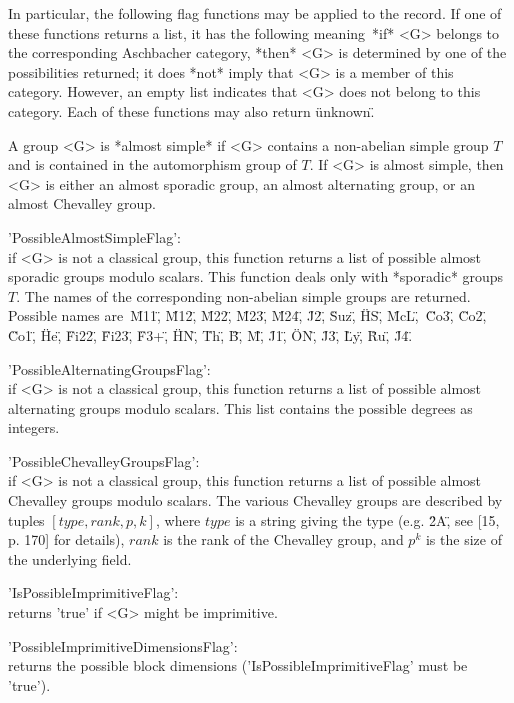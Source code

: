In particular, the following flag functions may be applied to the record.
If one of these functions returns a list, it has the following meaning\:\
*if* <G> belongs to the corresponding  Aschbacher category, *then* <G> is
determined by one of the possibilities returned; it does *not* imply that
<G> is a member  of this category. However, an  empty list indicates that
<G> does not belong  to this category.   Each of these functions may also
return \"unknown\".

A group <G> is *almost simple* if <G> contains a non-abelian simple group
$T$ and is contained in the automorphism group of $T$.   If <G> is almost
simple,   then <G>   is  either  an almost  sporadic     group, an almost
alternating group, or an almost Chevalley group.
    
'PossibleAlmostSimpleFlag':\\
    if  <G>  is not a  classical group, this function returns   a list of
    possible   almost sporadic groups modulo   scalars.   This
    function deals only  with *sporadic*  groups  $T$.  The names  of the
    corresponding non-abelian  simple groups are returned. Possible names
    are\:\ \"M11\", \"M12\", \"M22\",   \"M23\", \"M24\", \"J2\", \"Suz\",
    \"HS\",   \"McL\",\  \"Co3\",  \"Co2\",   \"Co1\",  \"He\", \"Fi22\",
    \"Fi23\", \"F3+\",  \"HN\",  \"Th\",  \"B\", \"M\",  \"J1\",  \"ON\",
    \"J3\", \"Ly\", \"Ru\", \"J4\".  

'PossibleAlternatingGroupsFlag':\\
    if   <G> is not  a classical  group, this function  returns a list of
    possible   almost  alternating  groups  modulo   scalars.   This list
    contains the possible degrees as integers.

'PossibleChevalleyGroupsFlag':\\
    if <G> is  not  a classical group,   this function returns a  list of
    possible almost    Chevalley  groups modulo  scalars.   The   various
    Chevalley groups  are described  by tuples  $[  type, rank, p, k  ]$,
    where  $type$ is  a  string giving  the type (e.g.   \"2A\", see [15,
    p. 170] for details), $rank$ is the  rank of the Chevalley group, and
    $p^k$ is the size of the underlying field.

'IsPossibleImprimitiveFlag':\\
    returns 'true' if <G> might be imprimitive.
    
'PossibleImprimitiveDimensionsFlag':\\
    returns the  possible block  dimensions  ('IsPossibleImprimitiveFlag'
    must be 'true').

